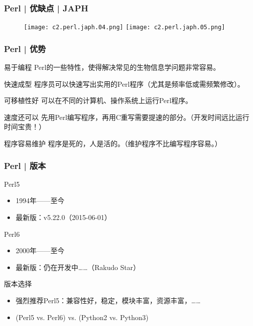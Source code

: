 \begin{frame}
  \frametitle{Perl | 优缺点 | JAPH}
  \begin{figure}
    \centering
    \texttt{[image: c2.perl.japh.04.png]}
    \quad
    \texttt{[image: c2.perl.japh.05.png]}
  \end{figure}
\end{frame}

\begin{frame}
  \frametitle{Perl | 优势}
  \begin{block}{易于编程}
    Perl的一些特性，使得解决常见的生物信息学问题非常容易。
  \end{block}
  \pause
  \begin{block}{快速成型}
    程序员可以快速写出实用的Perl程序（尤其是频率低或需频繁修改）。
  \end{block}
  \pause
  \begin{block}{可移植性好}
    可以在不同的计算机、操作系统上运行Perl程序。
  \end{block}
  \pause
  \begin{block}{速度还可以}
    先用Perl编写程序，再用C重写需要提速的部分。（开发时间远比运行时间宝贵！）
  \end{block}
  \pause
  \begin{block}{程序容易维护}
    程序是死的，人是活的。（维护程序不比编写程序容易。）
  \end{block}
\end{frame}

\begin{frame}
  \frametitle{Perl | 版本}
  \begin{block}{Perl5}
    \begin{itemize}
      \item 1994年——至今
      \item 最新版：v5.22.0（2015-06-01）
    \end{itemize}
  \end{block}
  \pause
  \begin{block}{Perl6}
    \begin{itemize}
      \item 2000年——至今
      \item 最新版：仍在开发中……（Rakudo Star）
    \end{itemize}
  \end{block}
  \pause
  \begin{block}{版本选择}
    \begin{itemize}
      \item 强烈推荐Perl5：兼容性好，稳定，模块丰富，资源丰富，……
      \item (Perl5 vs. Perl6) vs. (Python2 vs. Python3)
    \end{itemize}
  \end{block}
\end{frame}

